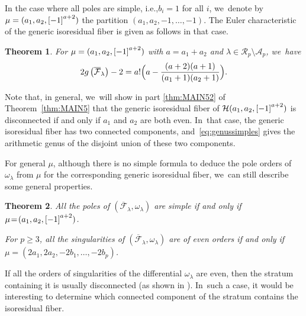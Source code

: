 \documentclass[11pt]{article}
\newcommand{\ie}{i.e.,\xspace}
\newcommand\calH{{\mathcal H}}
\newtheorem{thm}{Theorem}[section]
\theoremstyle{definition}
\begin{document}
In the case where all poles are simple, \ie $b_i = 1$ for all $i$, we~denote by $\mu = (a_1, a_2, \rec[-1][a+2])$ the partition $(a_{1},a_{2},-1,\dots,-1)$. The Euler characteristic of the generic isoresidual fiber is given as follows in that case.

\begin{thm}\label{thm:simple}
For $\mu = (a_1, a_2, \rec[-1][a+2])$ with $a=a_{1}+a_{2}$ and $\lambda\in \mathcal{R}_{p} \setminus \mathcal{A}_{p}$, we~have
\begin{equation}\label{eq:genussimples}
2g\left(\overline{\mathcal{F}}_{\lambda}\right)-2 =
a! \Bigl(a - \frac{(a+2)(a+1)}{(a_1+1)(a_2+1)} \Bigr).
\end{equation}
\end{thm}

Note that, in general, we~will show in part \eqref{thm:MAIN52} of Theorem~\ref{thm:MAIN5} that the generic isoresidual fiber of $\calH(a_1, a_2, \rec[-1][a+2])$ is disconnected if and only if $a_1$ and $a_2$ are both even. In~that case, the generic isoresidual fiber has two connected components, and~\eqref{eq:genussimples} gives the arithmetic genus of the disjoint union of these two components.

For general $\mu$, although there is no simple formula to deduce the pole orders of~$\omega_\lambda$ from $\mu$ for the corresponding generic isoresidual fiber, we~can still describe some general properties.

\begin{thm}\label{thm:MAIN3}
All the poles of $(\overline{\mathcal{F}}_{\lambda},\omega_{\lambda})$ are simple if and only if $\mu\!=\!(a_1, a_2, \rec[-1][a+2])$.

For $p \geq 3$, all the singularities of $(\overline{\mathcal{F}}_{\lambda},\omega_{\lambda})$ are of even orders if and only if $\mu=(2a_{1},2a_{2},-2b_{1},\dots,-2b_{p})$.
\end{thm}

If all the orders of singularities of the differential $\omega_{\lambda}$ are even, then the stratum containing it is usually disconnected (as shown in \cite{Bo}). In~such a case, it would be interesting to determine which connected component of the stratum contains the isoresidual fiber.
\end{document}
